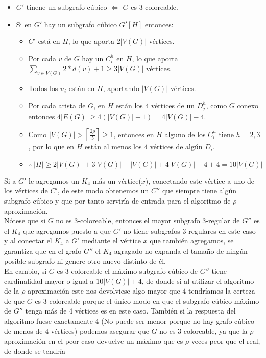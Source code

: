 \documentclass{article}
\begin{document}
\begin{itemize}
    \item $G'$ tinene un subgrafo c\'ubico $\Leftrightarrow $ $G$ es $3$-coloreable.
    \item Si en $G'$ hay un subgrafo c\'ubico $G'[H]$ entonces: 
    \begin{itemize}
        \item $C'$ est\'a en $H$, lo que aporta $2|V(G)|$ v\'ertices.
        \item Por cada $v$ de $G$ hay un $C_i^h$ en $H$, lo que aporta $\sum_{v \in V(G)} 2*d(v) + 1 \geq 3|V(G)|$ v\'ertices.
        \item Todos los $u_i$ est\'an en $H$, aportando $|V(G)|$ v\'ertices.
        \item Por cada arista de $G$, en $H$ est\'an los $4$ v\'ertices de un $D_j^h$, como $G$ conexo entonces $4|E(G)| \geq 4(|V(G)| - 1) = 4|V(G)|-4$.
        \item Como $|V(G)| > \left\lceil \frac{2 \rho}{5} \right\rceil \geq 1 $, entonces en $H$ alguno de los $C_i^h$ tiene $h =2,3$, por lo que en $H$ est\'an al menos los $4$ v\'ertices de alg\'un $D_i$.
        \item $\therefore~ |H| \geq 2|V(G)| + 3|V(G)| + |V(G)| + 4|V(G)|-4 +4 = 10|V(G)|$
    \end{itemize}
\end{itemize}
Si a $G'$ le agregamos un $K_4$ m\'as un v\'ertice($x$), conectando este v\'ertice a uno de los v\'ertices de $C'$, de este modo obtenemos un $C''$ que siempre tiene alg\'un subgrafo c\'ubico y que por tanto 
servir\'ia de entrada para el algoritmo de $\rho$-aproximaci\'on. \\

N\'otese que si $G$ no es $3$-coloreable, entonces el mayor subgrafo $3$-regular de $G''$ es el $K_4$ que agregamos puesto a que $G'$ no tiene 
subgrafos $3$-regulares en este caso y al conectar el $K_4$ a $G'$ mediante el v\'ertice $x$ que tambi\'en agregamos, se garantiza que en el grafo $G''$ el $K_4$
agragado no expanda el tama\~no de ning\'un posible subgrafo ni genere otro nuevo distinto de \'el.\\ 

En cambio, si $G$ es $3$-coloreable el m\'aximo subgrafo c\'ubico de $G''$ tiene cardinalidad mayor o igual a $10|V(G)| + 4$, de donde si al utilizar el algoritmo de la $\rho$-aproximaci\'on 
este nos devolviese algo mayor que $4$ tendr\'iamos la certeza de que $G$ es $3$-coloreable porque el \'unico modo en que el subgrafo c\'ubico m\'aximo de $G''$ tenga m\'as de $4$ v\'ertices es en este caso. Tambi\'en si 
la respuesta del algoritmo fuese exactamente $4$ (No puede ser menor porque no hay grafo c\'ubico de menos de $4$ v\'ertices) podemos asegurar que $G$ no es $3$-coloreable, ya que la $\rho$-aproximaci\'on en el peor caso devuelve un m\'aximo que es $\rho$ veces 
peor que el real, de donde se tendr\'ia 
\end{document}

